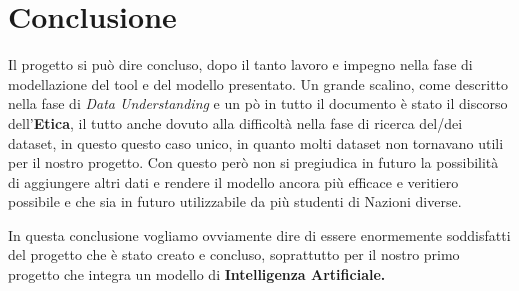 \documentclass[12pt]{article}
\begin{document}
\section{Conclusione}
Il progetto si può dire concluso, dopo il tanto lavoro e impegno nella fase di modellazione del tool e del modello presentato.
Un grande scalino, come descritto nella fase di \textit{Data Understanding} e un pò in tutto il documento è stato il discorso dell'\textbf{Etica},
il tutto anche dovuto alla difficoltà nella fase di ricerca del/dei dataset, in questo questo caso unico, in quanto molti dataset non tornavano utili per il nostro
progetto. Con questo però non si pregiudica in futuro la possibilità di aggiungere altri dati e rendere il modello ancora più efficace e veritiero possibile e che sia
in futuro utilizzabile da più studenti di Nazioni diverse.
\par
In questa conclusione vogliamo ovviamente dire di essere enormemente soddisfatti del progetto che è stato creato e concluso, soprattutto per il nostro primo progetto che integra un modello di \textbf{Intelligenza Artificiale.}
\end{document}
